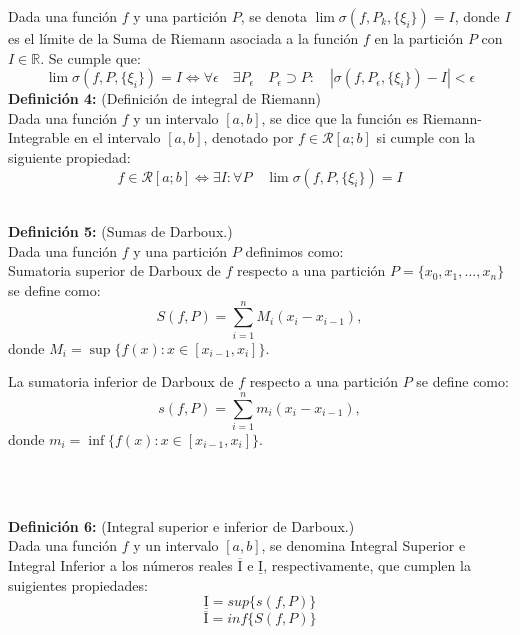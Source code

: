\documentclass[10pt]{article}
\begin{document}
 Dada una función $f$ y una partición $P$, se denota $\lim \sigma (f,P_k,\{\xi_i\}) = I$, donde $I$ es el límite de la Suma de Riemann asociada a la función $f$ en la partición $P$ con $I \in \mathbb{R}$. Se cumple que: 
				\begin{equation}
					\label{def:limR} 
					\lim \sigma (f,P,\{\xi_i\}) = I \iff \forall \epsilon \quad\exists P_\epsilon \quad P_\epsilon\supset P: \quad |\sigma (f,P_\epsilon,\{\xi_i\}) - I| < \epsilon
				\end{equation}
\textbf{Definición 4:} (Definición de integral de Riemann)
\\
 Dada una función $f$ y un intervalo $[a, b]$, se dice que la función es Riemann-Integrable en el intervalo $[a, b]$, denotado por $f\in\mathcal{R}[a; b]$ si cumple con la siguiente propiedad: 
				\begin{equation}
					\label{def:integR}
					f\in\mathcal{R}[a; b] \iff \exists I:\forall P \quad\lim \sigma (f,P,\{\xi_i\}) = I
				\end{equation}
                \\
                
\item \textbf{Definición 5:} (Sumas de Darboux.)
\\ Dada una función $f$ y una partición $P$ definimos como:
\\
Sumatoria superior de Darboux de $f$ respecto a una partición $P = \{x_0, x_1, \dots, x_n\}$ se define como:
\begin{equation}
    S(f, P) = \sum_{i=1}^{n} M_i (x_i - x_{i-1}),
\end{equation}
donde $M_i = \sup \{ f(x) : x \in [x_{i-1}, x_i] \}$.

La sumatoria inferior de Darboux de $f$ respecto a una partición $P$ se define como:
\begin{equation}
    s(f, P) = \sum_{i=1}^{n} m_i (x_i - x_{i-1}),
\end{equation}
donde $m_i = \inf \{ f(x) : x \in [x_{i-1}, x_i] \}$.

\\
\\

\item \textbf{Definición 6:} (Integral superior e inferior de Darboux.)
\\
Dada una función $f$ y un intervalo $[a, b]$, se denomina Integral Superior e Integral Inferior a los números reales $\overline{\mathrm{I}}$ e $\underline{\mathrm{I}}$, respectivamente, que cumplen la suigientes propiedades:
				\begin{equation}
					\label{def:ingInf}
					\underline{\mathrm{I}} = sup \{s(f, P)\}
				\end{equation}
				\begin{equation}
					\label{def:ingSup}
					\overline{\mathrm{I}} = inf \{S(f, P)\}
				\end{equation}
			\item 
\end{document}

